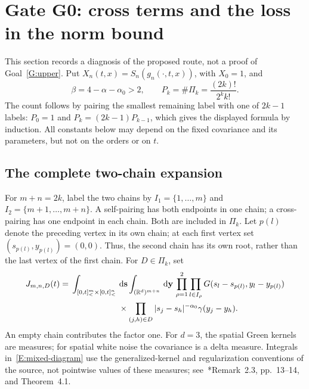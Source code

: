 \documentclass[12pt]{article}
\numberwithin{equation}{section}
\theoremstyle{definition}
\newcommand{\R}{\mathbb{R}}
\newcommand{\ud}{\,\mathrm{d}}
\begin{document}
\section{Gate G0: cross terms and the loss in the norm bound}\label{S:G0}

This section records a diagnosis of the proposed route, not a proof of
Goal~\ref{G:upper}. Put $X_n(t,x)=S_n(g_n(\cdot,t,x))$, with $X_0=1$, and
\[
  \beta=4-\alpha-\alpha_0>2,\qquad
  P_k=\#\Pi_k=\frac{(2k)!}{2^k k!}.
\]
The count follows by pairing the smallest remaining label with one of
$2k-1$ labels: $P_0=1$ and $P_k=(2k-1)P_{k-1}$, which gives the displayed
formula by induction. All constants below may depend on the fixed covariance and its parameters,
but not on the orders or on $t$.

\subsection{The complete two-chain expansion}

For $m+n=2k$, label the two chains by
$I_1=\{1,\ldots,m\}$ and $I_2=\{m+1,\ldots,m+n\}$.
A self-pairing has both endpoints in one chain; a cross-pairing has one
endpoint in each chain. Both are included in $\Pi_k$.
Let $p(l)$ denote the preceding vertex in its own chain; at each first
vertex set $(s_{p(l)},y_{p(l)})=(0,0)$. Thus, the second chain has its own
root, rather than the last vertex of the first chain. For $D\in\Pi_k$, set
\begin{equation}\label{E:mixed-diagram}
  \begin{split}
    J_{m,n,D}(t)
    ={}&\int_{[0,t]^m_<\times[0,t]^n_<}\ud\mathbf s
    \int_{(\R^d)^{m+n}}\ud\mathbf y\,
    \prod_{\rho=1}^2\prod_{l\in I_\rho}
    G(s_l-s_{p(l)},y_l-y_{p(l)})\\
    &\hspace{20mm}\times
    \prod_{(j,h)\in D}|s_j-s_h|^{-\alpha_0}\gamma(y_j-y_h).
  \end{split}
\end{equation}
An empty chain contributes the factor one. For $d=3$, the spatial Green
kernels are measures; for spatial white noise the covariance is a delta
measure. Integrals in~\eqref{E:mixed-diagram} use the generalized-kernel
and regularization conventions of the source, not pointwise values of
these measures; see~\cite{chen:author2026:time-dependency}*{Remark~2.3,
pp.~13--14, and Theorem~4.1}.
\end{document}
